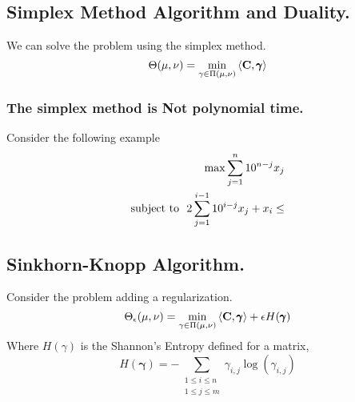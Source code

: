 \subsection{Simplex Method Algorithm and Duality.}
We can solve the problem using the simplex method.
\begin{equation}
	\Theta(\mu, \nu)=\min_{\gamma\in \Pi(\mu, \nu)}{\left\langle \mathbf{C}, \pmb{\gamma} \right\rangle}
\end{equation}
\subsubsection{The simplex method is Not polynomial time.}
Consider the following example
\begin{align}
	\max \sum_{j=1}^{n} 10^{n-j}x_j\\
	\text{subject to }\ 2\sum_{j=1}^{i-1}10^{i-j}x_j+x_i \leq 
\end{align}

\subsection{Sinkhorn-Knopp Algorithm.}
Consider the problem adding a regularization.
\begin{equation}
	\Theta_\epsilon(\mu, \nu)=\min_{\gamma\in \Pi(\mu, \nu)}{\left\langle \mathbf{C},\pmb{\gamma} \right\rangle+\epsilon H(\pmb{\gamma})}
\end{equation}
Where $H(\gamma)$ is the Shannon's Entropy defined for a matrix,
\begin{equation}
	H(\pmb{\gamma})=-\sum_{\substack{1\leq i \leq n\\ 1\leq j \leq m}}\gamma_{i,j}\log(\gamma_{i,j})
\end{equation} 

